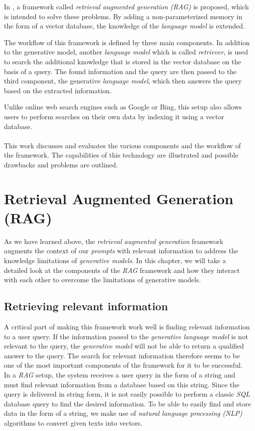 \documentclass{article}
\begin{document}
In \cite{RAG}, a framework called \textit{retrieval augmented generation (RAG)} is proposed, which is intended to solve these problems. By adding a non-parameterized memory in the form of a vector database, the knowledge of the \textit{language model} is extended. 

The workflow of this framework is defined by three main components. In addition to the generative model, another \textit{language model} which is called \textit{retriever}, is used to search the additional knowledge that is stored in the vector database on the basis of a query. The found information and the query are then passed to the third component, the generative \textit{language model}, which then answers the query based on the extracted information.

Unlike online web search engines such as Google or Bing, this setup also allows users to perform searches on their own data by indexing it using a vector database. 
\\
\\
This work discusses and evaluates the various components and the workflow of the framework. The capabilities of this technology are illustrated and possible drawbacks and problems are outlined.

\section{Retrieval Augmented Generation (RAG)}
As we have learned above, the \textit{retrieval augmented generation} framework augments the context of our \textit{prompts} with relevant information to address the knowledge limitations of \textit{generative models}.
In this chapter, we will take a detailed look at the components of the \textit{RAG} framework and how they interact with each other to overcome the limitations of generative models.

\subsection{Retrieving relevant information}
A critical part of making this framework work well is finding relevant information to a user query. If the information passed to the \textit{generative language model} is not relevant to the query, the \textit{generative model} will not be able to return a qualified answer to the query. The search for relevant information therefore seems to be one of the most important components of the framework for it to be successful. In a \textit{RAG} setup, the system receives a user query in the form of a string and must find relevant information from a database based on this string. Since the query is delivered in string form, it is not easily possible to perform a classic \textit{SQL} database query to find the desired information. To be able to easily find and store data in the form of a string, we make use of \textit{natural language processing (NLP)} algorithms to convert given texts into vectors.
\end{document}
